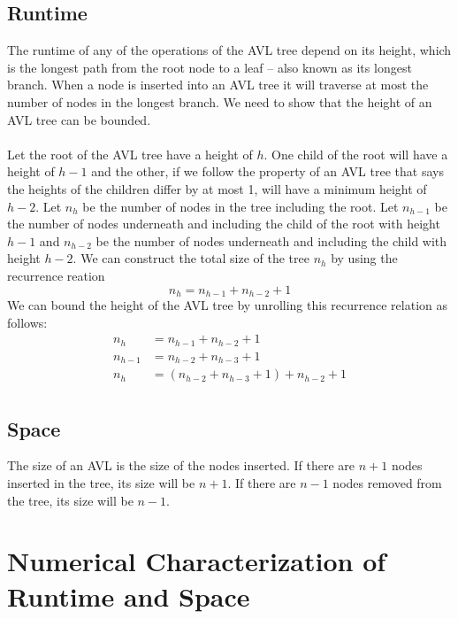 \documentclass[12pt]{article}
\begin{document}
\subsection*{Runtime}
The runtime of any of the operations of the AVL tree depend on its height,
which is the longest path from the root node to a leaf -- also known as its
longest branch.  When a node is inserted into an AVL tree it will traverse at
most the number of nodes in the longest branch.  We need to show that the height
of an AVL tree can be bounded.\\
\\
Let the root of the AVL tree have a height of $h$.  
One child of the root will have a height of $h-1$ and the other, if we follow 
the property of an AVL tree that says the heights of the children differ by at 
most 1, will have a minimum height of $h-2$.  Let $n_h$ be the number of nodes
in the tree including the root.  Let $n_{h-1}$ be the number of nodes underneath
and including the child of the root with height $h-1$ and $n_{h-2}$ be the
number of nodes underneath and including the child with height $h-2$.  We can
construct the total size of the tree $n_h$ by using the recurrence reation
$$
n_h = n_{h-1} + n_{h-2} + 1
$$
We can bound the height of the AVL tree by unrolling this recurrence relation as
follows:
\begin{align*}
n_h &= n_{h-1} + n_{h-2} + 1\\
n_{h-1} &= n_{h-2} + n_{h-3} + 1\\
n_h &= (n_{h-2} + n_{h-3} + 1) + n_{h-2} + 1\\
\end{align*}


\subsection*{Space}
The size of an AVL is the size of the nodes inserted.  If
there are $n + 1$ nodes inserted in the tree, its size will be $n + 1$.  If
there are $n - 1$ nodes removed from the tree, its size will be $n-1$.

\section*{Numerical Characterization of Runtime and Space}

\end{document}
